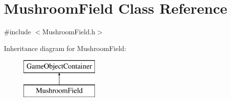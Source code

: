 \hypertarget{class_mushroom_field}{}\section{Mushroom\+Field Class Reference}
\label{class_mushroom_field}


{\ttfamily \#include $<$Mushroom\+Field.\+h$>$}

Inheritance diagram for Mushroom\+Field\+:\begin{figure}[H]
\begin{center}
\leavevmode
\includegraphics[height=2.000000cm]{class_mushroom_field}
\end{center}
\end{figure}
